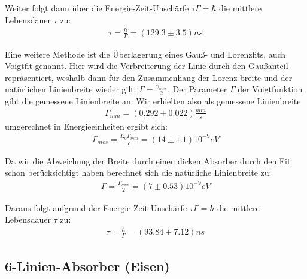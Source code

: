 \documentclass[12pt]{article}
\begin{document}
Weiter folgt dann über  die Energie-Zeit-Unschärfe $\tau \Gamma = \hbar$ die mittlere Lebensdauer $\tau$ zu:
\begin{align*}
 \tau = \frac{\hbar}{\Gamma} = (129.3 \pm 3.5)ns
\end{align*}

Eine weitere Methode ist die Überlagerung eines Gauß- und Lorenzfits, auch Voigtfit genannt. Hier wird die Verbreiterung der Linie durch den
Gaußanteil repräsentiert, weshalb dann für den Zusammenhang der Lorenz-breite und der natürlichen Linienbreite wieder gilt: $\Gamma = \frac{\gamma_{mes}}{2}$.
Der Parameter $\Gamma$ der Voigtfunktion gibt die gemessene Linienbreite an. Wir erhielten also als gemessene Linienbreite
\begin{align*}
 \Gamma_{mm} = (0.292 \pm 0.022) \frac{mm}{s}
\end{align*}
umgerechnet in Energieeinheiten ergibt sich:
\begin{align*}
 \Gamma_{mes} = \frac{E_0\Gamma_{mm}}{c} = (14 \pm 1.1) 10^{-9}eV
\end{align*}

Da wir die Abweichung der Breite durch einen dicken Absorber durch den Fit schon berücksichtigt haben berechnet sich die natürliche Linienbreite zu:
\begin{align*}
 \Gamma = \frac{\Gamma_{mes}}{2} = (7 \pm 0.53) 10^{-9}eV
\end{align*}

Daraus folgt aufgrund der Energie-Zeit-Unschärfe $\tau \Gamma = \hbar$ die mittlere Lebensdauer $\tau$ zu:
\begin{align*}
 \tau = \frac{\hbar}{\Gamma} = (93.84 \pm 7.12) ns
\end{align*}

\subsection{6-Linien-Absorber (Eisen)}
\end{document}
